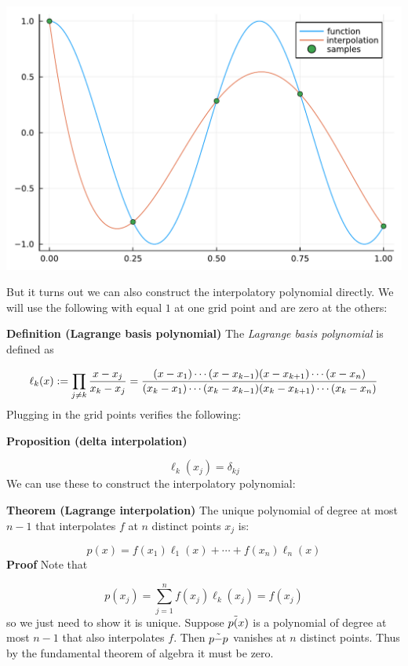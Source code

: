 \documentclass[12pt,a4paper]{article}
\begin{document}
\includegraphics[width=\linewidth]{jl_dOthw0/OP_methods_21_1.pdf}

But it turns out we can also construct the interpolatory polynomial directly. We will use the following with equal $1$ at one grid point and are zero at the others:

\textbf{Definition (Lagrange basis polynomial)} The \emph{Lagrange basis polynomial} is defined as

\[
\ensuremath{\ell}_k(x) := \ensuremath{\prod}_{j \ensuremath{\ne} k} {x-x_j \over x_k - x_j} =  {(x-x_1) \ensuremath{\cdots}(x-x_{k-1})(x-x_{k+1}) \ensuremath{\cdots} (x-x_n) \over (x_k - x_1) \ensuremath{\cdots} (x_k - x_{k-1}) (x_k - x_{k+1}) \ensuremath{\cdots} (x_k - x_n)}
\]
Plugging in the grid points verifies the following:

\textbf{Proposition (delta interpolation)}

\[
\ensuremath{\ell}_k(x_j) = \ensuremath{\delta}_{kj}
\]
We can use these to construct the interpolatory polynomial:

\textbf{Theorem (Lagrange interpolation)} The unique  polynomial of degree at most $n-1$ that interpolates $f$ at $n$ distinct points $x_j$ is:

\[
p(x) = f(x_1) \ensuremath{\ell}_1(x) + \ensuremath{\cdots} + f(x_n) \ensuremath{\ell}_n(x)
\]
\textbf{Proof} Note that

\[
p(x_j) = \ensuremath{\sum}_{j=1}^n f(x_j) \ensuremath{\ell}_k(x_j) = f(x_j)
\]
so we just need to show it is unique. Suppose $p\ensuremath{\tilde}(x)$ is a  polynomial of degree at most $n-1$ that also interpolates $f$. Then $p\ensuremath{\tilde} - p$ vanishes at $n$ distinct points. Thus by the fundamental theorem of algebra it must be zero.
\end{document}
